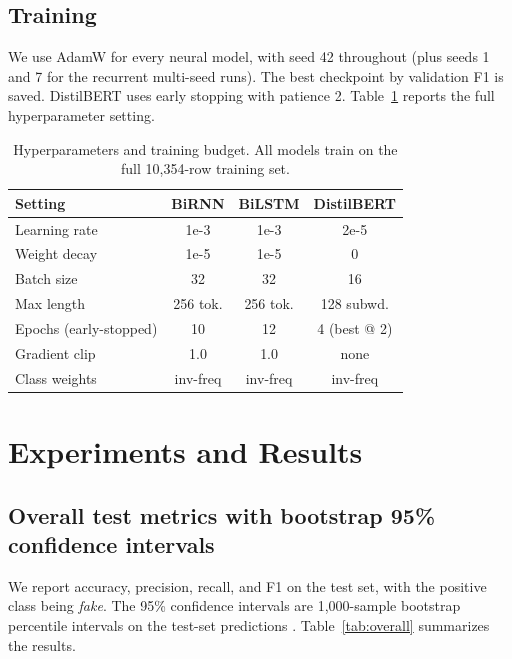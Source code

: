 \documentclass{article}
\begin{document}
\subsection{Training}
We use AdamW for every neural model, with seed 42 throughout (plus seeds 1 and 7 for the recurrent multi-seed runs). The best checkpoint by validation F1 is saved. DistilBERT uses early stopping with patience 2. Table~\ref{tab:hyperparams} reports the full hyperparameter setting.

\begin{table}[h]
\centering
\caption{Hyperparameters and training budget. All models train on the full 10,354-row training set.}
\label{tab:hyperparams}
\small
\begin{tabular}{lccc}
\toprule
Setting & BiRNN & BiLSTM & DistilBERT \\
\midrule
Learning rate & 1e-3 & 1e-3 & 2e-5 \\
Weight decay & 1e-5 & 1e-5 & 0 \\
Batch size & 32 & 32 & 16 \\
Max length & 256 tok. & 256 tok. & 128 subwd. \\
Epochs (early-stopped) & 10 & 12 & 4 (best @ 2) \\
Gradient clip & 1.0 & 1.0 & none \\
Class weights & inv-freq & inv-freq & inv-freq \\
\bottomrule
\end{tabular}
\end{table}

\section{Experiments and Results}

\subsection{Overall test metrics with bootstrap 95\% confidence intervals}
We report accuracy, precision, recall, and F1 on the test set, with the positive class being \emph{fake}. The 95\% confidence intervals are 1,000-sample bootstrap percentile intervals on the test-set predictions \citep{efron1986bootstrap}. Table~\ref{tab:overall} summarizes the results.
\end{document}
